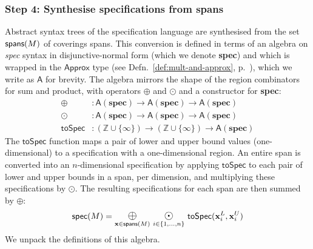 \documentclass[9pt,preprint]{sigplanconf}
\theoremstyle{definition}
\newcommand{\term}[1]{\texttt{#1}}
\newcommand{\vect}[1]{\textbf{#1}}
\begin{document}
\subsubsection{Step 4: Synthesise specifications from spans}
\label{sec:inf-step4}

\newcommand{\oplusbig}{\operatornamewithlimits{\term{\Large{$\oplus$}}}}
\newcommand{\odobig}{\operatornamewithlimits{\term{\Large{$\odot$}}}}
\newcommand{\bplus}{\operatornamewithlimits{\term{\Large{+}}}}
\newcommand{\tySum}[1]{#1^{\term{+}}}
\newcommand{\tyProd}[1]{#1^{\term{*}}}
\newcommand{\specDNF}{\textbf{spec}}

Abstract syntax trees of the specification language
are synthesised from the set $\textsf{spans}(M)$ of coverings spans. 
This conversion is defined in terms
of an algebra on \textit{spec} syntax in disjunctive-normal form
(which we denote \specDNF{}) and which is wrapped
in the $\textsf{Approx}$ type (see
Defn.~\ref{def:mult-and-approx},
p.~\pageref{def:mult-and-approx}), which we write as $\mathsf{A}$
for brevity.  The algebra mirrors the shape
of the region combinators for sum and product, 
with operators $\oplus$ and $\odot$ and a constructor for \specDNF{}:
\begin{align*}
\oplus & : \mathsf{A}(\specDNF) \rightarrow \mathsf{A}(\specDNF) \rightarrow
  \mathsf{A}(\specDNF) \\
\odot & : \mathsf{A}(\specDNF) \rightarrow \mathsf{A}(\specDNF) \rightarrow
        \mathsf{A}(\specDNF) \\
\mathsf{toSpec} & : (\mathbb{Z} \cup \{\infty\}) \rightarrow (\mathbb{Z} \cup
  \{\infty\})  \rightarrow \mathsf{A}(\specDNF)
\end{align*}
The $\mathsf{toSpec}$ function maps a pair of lower and upper bound
values (one-dimensional) to a specification with a one-dimensional region. 
An entire span is converted into an $n$-dimensional
specification by applying $\mathsf{toSpec}$ to each
pair of lower and upper bounds in a span, per dimension, and multiplying these
specifications by $\odot$. The resulting specifications for
each span are then summed by $\oplus$:
\begin{equation*}
\textsf{spec}(M) = 
\oplusbig\limits_{\vect{x} \in \spanOp(M)} \,
\odobig\limits_{i \in \{1, \ldots, n\}} \, \mathsf{toSpec}(\vect{x}^L_i, \vect{x}^U_i)
\end{equation*}
We unpack the definitions of this algebra.
\end{document}
